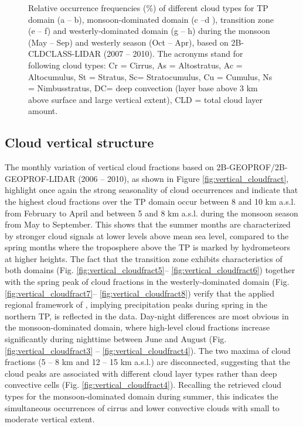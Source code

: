 \documentclass[alpha-refs]{wiley-article}
\begin{document}
\begin{figure}
\begin{subfigure}[b]{0.5\textwidth}
        \label{fig:cld_type8}
        \end{subfigure}  
        \caption{Relative occurrence frequencies (\%) of different cloud types for TP domain (a -- b), monsoon-dominated domain (c --d ), transition zone (e -- f) and westerly-dominated domain (g -- h) during the monsoon (May -- Sep) and westerly season (Oct -- Apr), based on 2B-CLDCLASS-LIDAR (2007 -- 2010). The acronyms stand for following cloud types: Cr = Cirrus, As = Altostratus, Ac = Altocumulus, St = Stratus, Sc= Stratocumulus, Cu = Cumulus, Ns = Nimbusstratus, DC= deep convection (layer base above 3 km above surface and large vertical extent), CLD = total cloud layer amount.}
\label{fig:cld_type}
\end{figure}


\subsection{Cloud vertical structure}

The monthly variation of vertical cloud fractions based on 2B-GEOPROF/2B-GEOPROF-LIDAR (2006 -- 2010), as shown in Figure \ref{fig:vertical_cloudfract},  highlight once again the strong seasonality of cloud occurrences and indicate that the highest cloud fractions over the TP domain occur between 8 and 10 km a.s.l. from February to April and between 5 and 8 km a.s.l. during the monsoon season from May to September. This shows that the summer months are characterized by stronger cloud signals at lower levels above mean sea level, compared to the spring months where the troposphere above the TP is marked by hydrometeors at higher heights. The fact that the transition zone exhibits characteristics of both domains (Fig. \ref{fig:vertical_cloudfract5}-- \ref{fig:vertical_cloudfract6}) together with the spring peak of cloud fractions in the westerly-dominated domain (Fig. \ref{fig:vertical_cloudfract7}-- \ref{fig:vertical_cloudfract8}) verify that the applied regional framework of \citet{cu13_2}, implying precipitation peaks during spring in the northern TP, is reflected in the data. Day-night differences are most obvious in the monsoon-dominated domain, where high-level cloud fractions increase significantly during nighttime between June and August (Fig. \ref{fig:vertical_cloudfract3} -- \ref{fig:vertical_cloudfract4}). The two maxima of cloud fractions (5 -- 8 km and 12 -- 15 km a.s.l.) are disconnected, suggesting that the cloud peaks are associated with different cloud layer types rather than deep convective cells (Fig. \ref{fig:vertical_cloudfract4}). Recalling the retrieved cloud types for the monsoon-dominated domain during summer, this indicates the simultaneous occurrences of cirrus and lower convective clouds with small to moderate vertical extent. 
\end{document}
